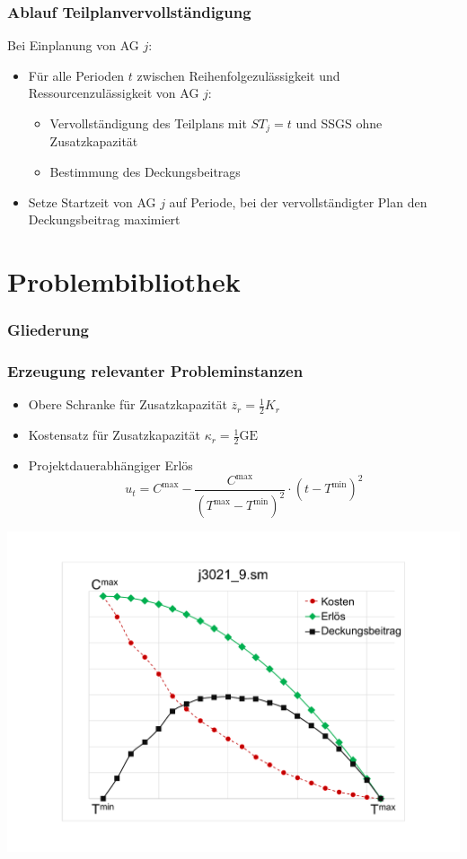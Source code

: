 \begin{frame}
\frametitle{Ablauf Teilplanvervollständigung}
Bei Einplanung von AG $j$:
\vspace*{2mm}
\begin{itemize}
\item Für alle Perioden $t$ zwischen Reihenfolgezulässigkeit und Ressourcenzulässigkeit von AG $j$:
\begin{itemize}
\item Vervollständigung des Teilplans mit $ST_j=t$ und SSGS ohne Zusatzkapazität
\item Bestimmung des Deckungsbeitrags\\[3mm]
\end{itemize}
\item Setze Startzeit von AG $j$ auf Periode, bei der vervollständigter Plan den Deckungsbeitrag maximiert
\end{itemize}
\end{frame}

\section{Problembibliothek}
\begin{frame}
\frametitle{Gliederung}
\tableofcontents[current] %
\end{frame}

\begin{frame}
\frametitle{Erzeugung relevanter Probleminstanzen}

\begin{itemize}
\item Obere Schranke für Zusatzkapazität $\overline{z}_r=\frac{1}{2}K_r$
\item Kostensatz für Zusatzkapazität $\kappa_r=\frac{1}{2}\mbox{GE}$
\item Projektdauerabhängiger Erlös \[u_{t}=C^{\mbox{max}} - \frac{C^{\mbox{max}}}{(T^{\mbox{max}}-T^{\mbox{min}})^2} \cdot (t-T^{\mbox{min}})^2\]
\end{itemize}

\begin{center}
\includegraphics[scale=0.26]{images/DeadlineCosts.pdf}
\end{center}

\end{frame}


